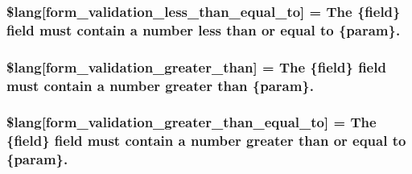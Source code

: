 \subsubsection[{\$lang}]{\setlength{\rightskip}{0pt plus 5cm}\$lang\mbox{[}\textquotesingle{}form\+\_\+validation\+\_\+less\+\_\+than\+\_\+equal\+\_\+to\textquotesingle{}\mbox{]} = \textquotesingle{}The \{field\} field must contain {\bf a} number less than or equal to \{param\}.\textquotesingle{}}\label{system_2language_2english_2form__validation__lang_8php_a687b3be07540d640e2b308086c855c83}
\hypertarget{system_2language_2english_2form__validation__lang_8php_aa01f66851d0140114c2216e6ab5daf06}{}
\subsubsection[{\$lang}]{\setlength{\rightskip}{0pt plus 5cm}\$lang\mbox{[}\textquotesingle{}form\+\_\+validation\+\_\+greater\+\_\+than\textquotesingle{}\mbox{]} = \textquotesingle{}The \{field\} field must contain {\bf a} number greater than \{param\}.\textquotesingle{}}\label{system_2language_2english_2form__validation__lang_8php_aa01f66851d0140114c2216e6ab5daf06}
\hypertarget{system_2language_2english_2form__validation__lang_8php_a255dc63d9dceb22751acebc1ffc43be8}{}
\subsubsection[{\$lang}]{\setlength{\rightskip}{0pt plus 5cm}\$lang\mbox{[}\textquotesingle{}form\+\_\+validation\+\_\+greater\+\_\+than\+\_\+equal\+\_\+to\textquotesingle{}\mbox{]} = \textquotesingle{}The \{field\} field must contain {\bf a} number greater than or equal to \{param\}.\textquotesingle{}}\label{system_2language_2english_2form__validation__lang_8php_a255dc63d9dceb22751acebc1ffc43be8}
\hypertarget{system_2language_2english_2form__validation__lang_8php_ad29f9046f70e4b900cf5283143de0618}{}
